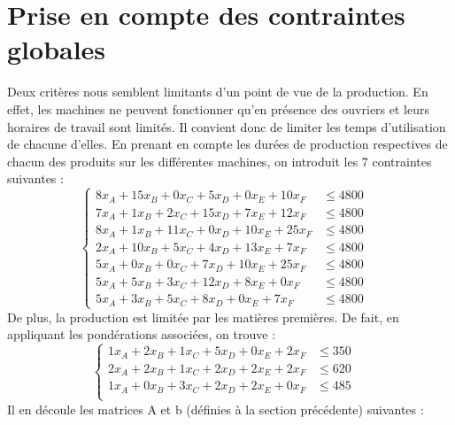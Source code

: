 \documentclass[12pt]{article}
\begin{document}
\section{Prise en compte des contraintes globales}
\label{globconst}
Deux critères nous semblent limitants d'un point de vue de la production. En effet, les machines ne peuvent fonctionner qu'en présence des ouvriers et leurs horaires de travail sont limités. Il convient donc de limiter les temps d'utilisation de chacune d'elles.
En prenant en compte les durées de production respectives de chacun des produits sur les différentes machines, on introduit les 7 contraintes suivantes :
\begin{equation*}
\left\{
\begin{aligned}
    8x_{A} + 15x_{B} + 0x_{C} + 5x_{D} + 0x_{E} + 10x_{F} &\leq 4800
    \quad\\
      7x_{A} + 1x_{B} + 2x_{C} + 15x_{D} + 7x_{E} + 12x_{F} &\leq 4800 \\
      8x_{A} + 1x_{B} + 11x_{C} + 0x_{D} + 10x_{E} + 25x_{F} &\leq 4800 \\
      2x_{A} + 10x_{B} + 5x_{C} + 4x_{D} + 13x_{E} + 7x_{F} &\leq 4800 \\
      5x_{A} + 0x_{B} + 0x_{C} + 7x_{D} + 10x_{E} + 25x_{F} &\leq 4800 \\
      5x_{A} + 5x_{B} + 3x_{C} + 12x_{D} + 8x_{E} + 0x_{F} &\leq 4800 \\
      5x_{A} + 3x_{B} + 5x_{C} + 8x_{D} + 0x_{E} + 7x_{F} &\leq 4800 
\end{aligned}
\right.
\end{equation*}
De plus, la production est limitée par les matières premières. De fait, en appliquant les pondérations associées, on trouve :
\begin{equation*}
\left\{
\begin{aligned}
         1x_{A} + 2x_{B} + 1x_{C} + 5x_{D} + 0x_{E} + 2x_{F} &\leq 350 \quad\\
      2x_{A} + 2x_{B} + 1x_{C} + 2x_{D} + 2x_{E} + 2x_{F} &\leq 620 \\
      1x_{A} + 0x_{B} + 3x_{C} + 2x_{D} + 2x_{E} + 0x_{F} &\leq 485 \\
\end{aligned}
\right.
\end{equation*}
Il en découle les matrices A et b (définies à la section précédente) suivantes :
\end{document}
